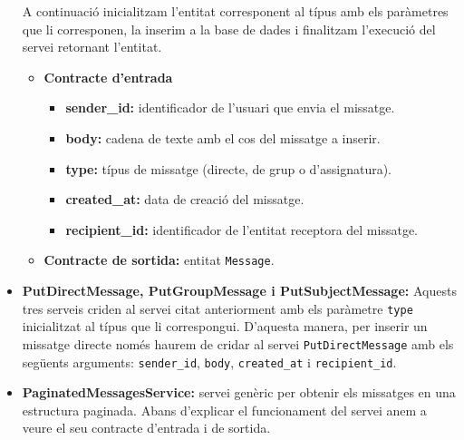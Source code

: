 \begin{itemize}
			A continuació inicialitzam l'entitat corresponent al típus amb els paràmetres que li corresponen, la inserim a la base de dades i finalitzam l'execució del servei retornant l'entitat.
			
				\begin{itemize}
					\item \textbf{Contracte d'entrada}
						\begin{itemize}
							\item \textbf{sender\_id:} identificador de l'usuari que envia el missatge.
							\item \textbf{body:} cadena de texte amb el cos del missatge a inserir.
							\item \textbf{type:} típus de missatge (directe, de grup o d'assignatura).
							\item \textbf{created\_at:} data de creació del missatge.
							\item \textbf{recipient\_id:} identificador de l'entitat receptora del missatge.
						\end{itemize}
					\item \textbf{Contracte de sortida:} entitat \texttt{Message}.
			\end{itemize}
			
			
			
			\item \textbf{PutDirectMessage, PutGroupMessage i PutSubjectMessage:} Aquests tres serveis criden al servei citat anteriorment amb els paràmetre \texttt{type} inicialitzat al típus que li correspongui. D'aquesta manera, per inserir un missatge directe només haurem de cridar al servei \texttt{PutDirectMessage} amb els següents arguments: \texttt{sender\_id}, \texttt{body}, \texttt{created\_at} i \texttt{recipient\_id}.
				
			\item \textbf{PaginatedMessagesService:} servei genèric per obtenir els missatges en una estructura paginada.  Abans d'explicar el funcionament del servei anem a veure el seu contracte d'entrada i de sortida.
			

\end{itemize}
